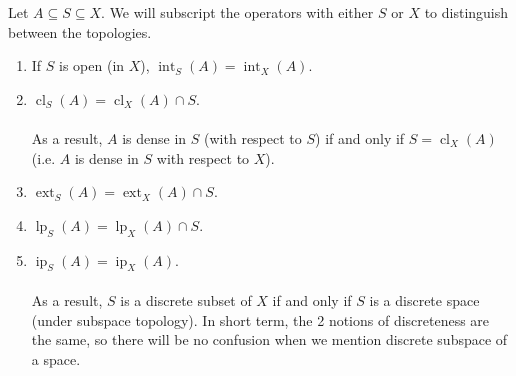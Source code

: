\documentclass{treatise}
\begin{document}
\begin{proposition}
Let $A \subseteq S \subseteq X$. We will subscript the operators with either $S$ or $X$ to distinguish between the topologies.
\begin{enumerate}
    \item If $S$ is open (in $X$), $\operatorname{int}_S (A) = \operatorname{int}_X (A)$.
    \item $\operatorname{cl}_S (A) = \operatorname{cl}_X (A) \cap S$.
    \\
    \\
    As a result, $A$ is dense in $S$ (with respect to $S$) if and only if $S = \operatorname{cl}_X (A)$ (i.e. $A$ is dense in $S$ with respect to $X$).
    \item $\operatorname{ext}_S (A) = \operatorname{ext}_X (A) \cap S$.
    \item $\operatorname{lp}_S (A) = \operatorname{lp}_X (A) \cap S$.
    \item $\operatorname{ip}_S (A) = \operatorname{ip}_X (A)$.
    \\
    \\
    As a result, $S$ is a discrete subset of $X$ if and only if $S$ is a discrete space (under subspace topology). In short term, the 2 notions of discreteness are the same, so there will be no confusion when we mention discrete subspace of a space.
\end{enumerate}
\end{proposition}
\end{document}
